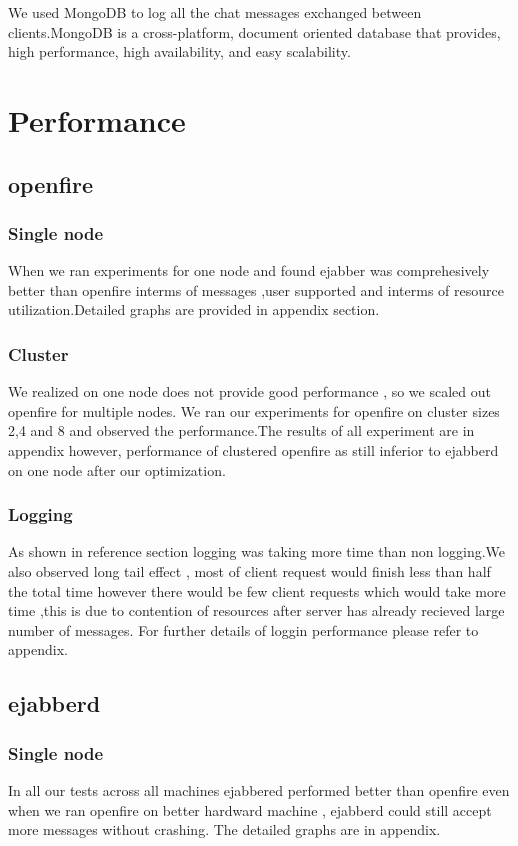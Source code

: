 \documentclass[a4paper, twocolumn]{article}
\begin{document}
We used MongoDB to log all the chat messages exchanged between clients.MongoDB is a cross-platform, document oriented database that provides, high performance, high availability, and easy scalability. 



\section{Performance}
\subsection{openfire}
\subsubsection{Single node}
When we ran experiments for one node and found  ejabber was comprehesively better than openfire interms of messages ,user supported and interms of resource utilization.Detailed graphs are provided in appendix section.

\subsubsection{Cluster}
We realized on one node does not provide good performance , so we scaled out openfire for multiple nodes. We ran our experiments for openfire on cluster sizes 2,4 and 8 and observed the performance.The results of all experiment are in appendix however, performance of clustered openfire as still inferior to ejabberd on one node after our optimization.

\subsubsection{Logging}

As shown in reference section logging was taking more time than non logging.We also observed long tail effect , most of client request would finish less than half the total time however there would be few client requests which would take more time ,this is due to contention of resources after server has already recieved large number of messages. For further details of loggin performance please refer to appendix.

\subsection{ejabberd}
\subsubsection{Single node}
In all our tests across all machines ejabbered performed better than openfire even when we ran openfire on better hardward machine , ejabberd could still accept more messages without crashing. The detailed graphs are in appendix.
\end{document}

